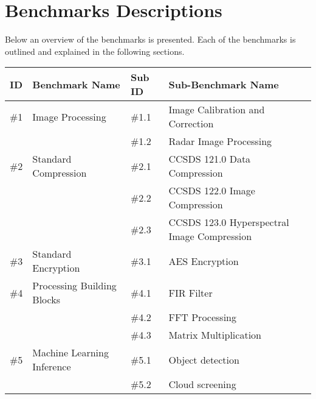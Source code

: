 \documentclass{report}
\begin{document}
\newpage


\newpage

\chapter{Benchmarks Descriptions}

Below an overview of the benchmarks is presented. Each of the benchmarks is outlined and explained in the following sections. 
\\

\begin{tabular}{|l|l|l|l|}
    \hline
    ID  & Benchmark Name                    & Sub ID    & Sub-Benchmark Name \\
    \hline
    \#1	& Image Processing                  & \#1.1	    & Image Calibration and Correction \\ 
	    &                                   & \#1.2	    & Radar Image Processing \\
	\hline
    \#2	& Standard Compression	            & \#2.1	    & CCSDS 121.0 Data Compression \\
	    &                                   & \#2.2     & CCSDS 122.0 Image Compression \\
	    &                                   & \#2.3     & CCSDS 123.0 Hyperspectral Image Compression \\
	\hline
    \#3	& Standard Encryption	            & \#3.1     & AES Encryption \\
    \hline
    \#4 & Processing Building Blocks	    & \#4.1     & FIR Filter \\
	    &                                   & \#4.2     & FFT Processing \\
	    &                                   & \#4.3     & Matrix Multiplication \\
	\hline
    \#5 & Machine Learning Inference           & \#5.1     & Object detection \\
	    &                                   & \#5.2     & Cloud screening \\
	\hline
\end{tabular}
\label{tab:benchmarks}
\end{document}
